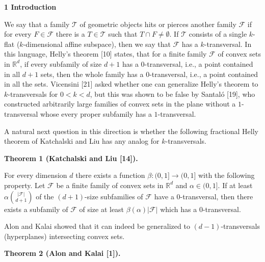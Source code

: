 \par\medskip\noindent\textbf{1 Introduction}\par
We say that a family $\mathcal{T}$ of geometric objects hits or pierces another family $\mathcal{F}$ if for every $F\in\mathcal{F}$ there is a $T\in\mathcal{T}$ such that $T\cap F\neq\emptyset$. If $\mathcal{T}$ consists of a single $k$-flat ($k$-dimensional affine subspace), then we say that $\mathcal{F}$ has a $k$-transversal. In this language, Helly’s theorem [10] states, that for a finite family $\mathcal{F}$ of convex sets in $\mathbb{R}^{d}$, if every subfamily of size $d+1$ has a $0$-transversal, i.e., a point contained in all $d+1$ sets, then the whole family has a $0$-transversal, i.e., a point contained in all the sets. Vicensini [21] asked whether one can generalize Helly’s theorem to $k$-transversals for $0<k<d$, but this was shown to be false by Santaló [19], who constructed arbitrarily large families of convex sets in the plane without a $1$-transversal whose every proper subfamily has a $1$-transversal.
\par
\par
A natural next question in this direction is whether the following fractional Helly theorem of Katchalski and Liu has any analog for $k$-transversals.
\par
\par
\par\medskip\noindent\textbf{Theorem 1 (Katchalski and Liu [14]).}\par
For every dimension $d$ there exists a function $\beta\colon(0,1]\to(0,1]$ with the following property. Let $\mathcal{F}$ be a finite family of convex sets in $\mathbb{R}^{d}$ and $\alpha\in(0,1]$. If at least $\alpha\binom{|\mathcal{F}|}{d+1}$ of the $(d+1)$-size subfamilies of $\mathcal{F}$ have a $0$-transversal, then there exists a subfamily of $\mathcal{F}$ of size at least $\beta(\alpha)|\mathcal{F}|$ which has a $0$-transversal.
\par
\par
\par
Alon and Kalai showed that it can indeed be generalized to $(d-1)$-transversals (hyperplanes) intersecting convex sets.
\par
\par
\par\medskip\noindent\textbf{Theorem 2 (Alon and Kalai [1]).}\par
